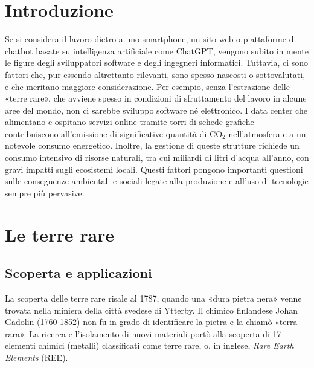 \documentclass[12pt,a4paper,oneside]{book}
\begin{document}
\restoregeometry




\topmargin=-2cm
\setcounter{page}{1}
\textheight=25cm  %
\tableofcontents

\raggedbottom

\setcounter{chapter}{-1}
\pagestyle{plain}
\chapter{Introduzione}

Se si considera il lavoro dietro a uno smartphone, un sito web o piattaforme di chatbot basate su intelligenza artificiale come ChatGPT, vengono subito in mente le figure degli sviluppatori software e degli ingegneri informatici. Tuttavia, ci sono fattori che, pur essendo altrettanto rilevanti, sono spesso nascosti o sottovalutati, e che meritano maggiore considerazione.
Per esempio, senza l'estrazione delle «terre rare», che avviene spesso in condizioni di sfruttamento del lavoro in alcune aree del mondo, non ci sarebbe sviluppo software né elettronico. I data center che alimentano e ospitano servizi online tramite torri di schede grafiche contribuiscono all'emissione di significative quantità di CO$_2$ nell'atmosfera e a un notevole consumo energetico. Inoltre, la gestione di queste strutture richiede un consumo intensivo di risorse naturali, tra cui miliardi di litri d'acqua all'anno, con gravi impatti sugli ecosistemi locali. Questi fattori pongono importanti questioni sulle conseguenze ambientali e sociali legate alla produzione e all'uso di tecnologie sempre più pervasive.

\chapter{Le terre rare}

\section{Scoperta e applicazioni}

La scoperta delle terre rare risale al 1787, quando una «dura pietra nera» venne trovata nella miniera della città svedese di Ytterby. Il chimico finlandese Johan Gadolin (1760-1852) non fu in grado di identificare la pietra e la chiamò «terra rara». La ricerca e l'isolamento di nuovi materiali portò alla scoperta di 17 elementi chimici (metalli) classificati come terre rare, o, in inglese, \textit{Rare Earth Elements} (REE). 
\end{document}
